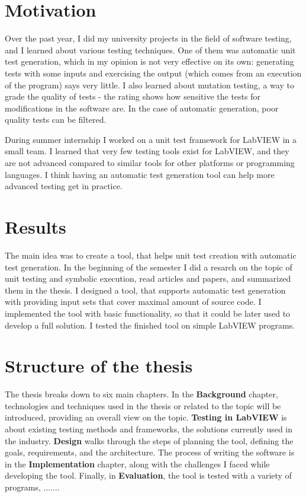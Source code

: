 \section{Motivation}
Over the past year, I did my university projects in the field of software testing, and I learned about various testing techniques. One of them was automatic unit test generation, which in my opinion is not very effective on its own: generating tests with some inputs and exercising the output (which comes from an execution of the program) says very little. I also learned about mutation testing, a way to grade the quality of tests - the rating shows how sensitive the tests for modifications in the software are. In the case of automatic generation, poor quality tests can be filtered.

During summer internship I worked on a unit test framework for LabVIEW in a small team. I learned that very few testing tools exist for LabVIEW, and they are not advanced compared to similar tools for other platforms or programming languages. I think having an automatic test generation tool can help more advanced testing get in practice.


\section{Results}
The main idea was to create a tool, that helps unit test creation with automatic test generation. In the beginning of the semester I did a resarch on the topic of unit testing and symbolic execution, read articles and papers, and summarized them in the thesis. I designed a tool, that supports automatic test generation with providing input sets that cover maximal amount of source code. I implemented the tool with basic functionality, so that it could be later used to develop a full solution. I tested the finished tool on simple LabVIEW programs.
\section{Structure of the thesis}
The thesis breaks down to six main chapters. In the \textbf{Background} chapter, technologies and techniques used in the thesis or related to the topic will be introduced, providing an overall view on the topic. \textbf{Testing in LabVIEW} is about existing testing methods and frameworks, the solutions currently used in the industry. \textbf{Design} walks through the steps of planning the tool, defining the goals, requirements, and the architecture. The process of writing the software is in the \textbf{Implementation} chapter, along with the challenges I faced while developing the tool. Finally, in \textbf{Evaluation}, the tool is tested with a variety of programs, .......
\pagebreak